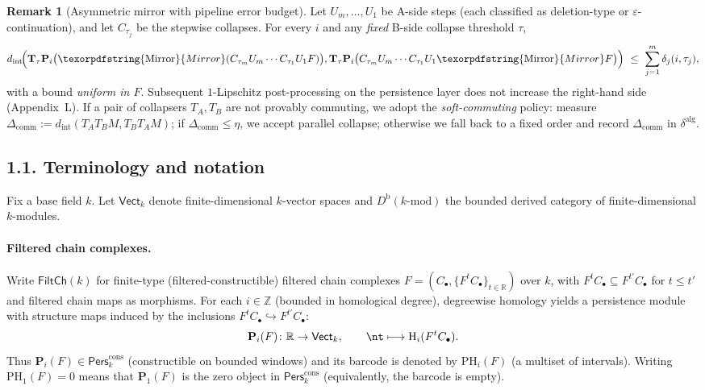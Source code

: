 \documentclass[11pt]{article}
\newcommand{\Pers}{\mathsf{Pers}}
\numberwithin{equation}{section}
\theoremstyle{definition}
\newtheorem{remark}[theorem]{Remark}
\DeclareRobustCommand{\Mirror}{\texorpdfstring{\ensuremath{\operatorname{Mirror}}}{Mirror}}
\providecommand{\n}{\unskip\space}
\begin{document}
\begin{remark}[Asymmetric mirror with pipeline error budget]\label{rk:asym-mirror}
Let $U_m,\dots,U_1$ be A-side steps (each classified as deletion-type or $\varepsilon$-continuation), and let $C_{\tau_j}$ be the stepwise collapses. For every $i$ and any \emph{fixed} B-side collapse threshold $\tau$,
\[
d_{\mathrm{int}}\!\Big(\n\mathbf{T}_\tau \mathbf{P}_i\big(\Mirror(C_{\tau_m}U_m\cdots C_{\tau_1}U_1F)\big),\ \n\mathbf{T}_\tau \mathbf{P}_i\big(C_{\tau_m}U_m\cdots C_{\tau_1}U_1\Mirror F\big)\n\Big)\ \le\ \sum_{j=1}^m \delta_j(i,\tau_j),
\]
with a bound \emph{uniform in $F$}. Subsequent $1$-Lipschitz post-processing on the persistence layer does not increase the right-hand side (Appendix~L). If a pair of collapsers $T_A,T_B$ are not provably commuting, we adopt the \emph{soft-commuting} policy: measure $\Delta_{\mathrm{comm}}:=d_{\mathrm{int}}(T_A T_B M,T_B T_A M)$; if $\Delta_{\mathrm{comm}}\le \eta$, we accept parallel collapse; otherwise we fall back to a fixed order and record $\Delta_{\mathrm{comm}}$ in $\delta^{\mathrm{alg}}$.
\end{remark}

\subsection*{1.1. Terminology and notation}
Fix a base field $k$. Let $\mathsf{Vect}_k$ denote finite-dimensional $k$-vector spaces and $D^{\mathrm{b}}(k\text{-mod})$ the bounded derived category of finite-dimensional $k$-modules.

\paragraph{Filtered chain complexes.}
Write $\mathsf{FiltCh}(k)$ for finite-type (filtered-constructible) filtered chain complexes 
$F=(C_\bullet,\{F^{t}C_\bullet\}_{t\in\mathbb{R}})$ over $k$, with 
$F^{t}C_\bullet\subseteq F^{t'}C_\bullet$ for $t\le t'$ and filtered chain maps as morphisms.
For each $i\in\mathbb{Z}$ (bounded in homological degree), degreewise homology yields a persistence module with structure maps induced by the inclusions $F^{t}C_\bullet\hookrightarrow F^{t'}C_\bullet$:
\[
\mathbf{P}_i(F)\colon \mathbb{R}\to \mathsf{Vect}_k,\qquad\nt\longmapsto \mathrm{H}_i(F^{t}C_\bullet).
\]
Thus $\mathbf{P}_i(F)\in \Pers^{\mathrm{cons}}_k$ (constructible on bounded windows) and its barcode is denoted by $\mathrm{PH}_i(F)$ (a multiset of intervals). 
Writing $\mathrm{PH}_1(F)=0$ means that $\mathbf{P}_1(F)$ is the zero object in 
$\Pers^{\mathrm{cons}}_k$ (equivalently, the barcode is empty).
\end{document}
